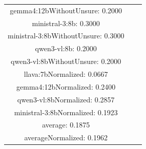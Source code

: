 \documentclass[a4paper]{article}
\begin{document}
\begin{tabular}{ccc}
gemma4:12bWithoutUnsure: 0.2000 \\ ministral-3:8b: 0.3000 \\ ministral-3:8bWithoutUnsure: 0.3000 \\ qwen3-vl:8b: 0.2000 \\ qwen3-vl:8bWithoutUnsure: 0.2000 \\ llava:7bNormalized: 0.0667 \\ gemma4:12bNormalized: 0.2400 \\ qwen3-vl:8bNormalized: 0.2857 \\ ministral-3:8bNormalized: 0.1923 \\ average: 0.1875 \\ averageNormalized: 0.1962 \end{minipage}\\
\end{tabular}

\vspace{5mm}
\end{document}
